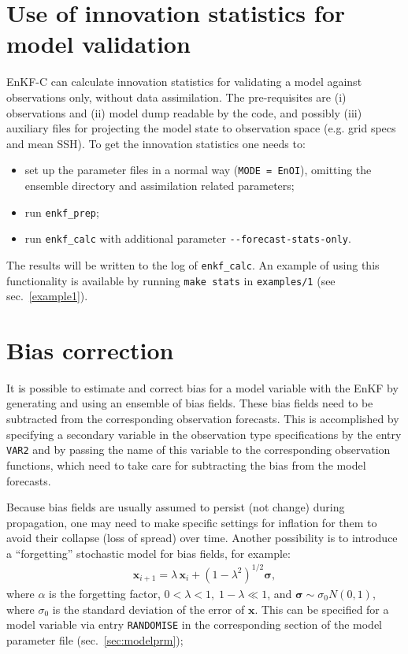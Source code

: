 \documentclass[11pt]{report}
\newcommand{\mb} {\mathbf}
\newcommand{\ms} {\boldsymbol}
\begin{document}
\section{Use of innovation statistics for model validation}

EnKF-C can calculate innovation statistics for validating a model against observations only, without data assimilation.
The pre-requisites are (i) observations and (ii) model dump readable by the code, and possibly (iii) auxiliary files for projecting the model state to observation space (e.g. grid specs and mean SSH).
To get the innovation statistics one needs to:
\begin{itemize}
\item set up the parameter files in a normal way (\verb|MODE = EnOI|), omitting the ensemble directory and assimilation related parameters;
\item run \verb|enkf_prep|;
\item run \verb|enkf_calc| with additional parameter \verb|--forecast-stats-only|.
\end{itemize}
The results will be written to the log of \verb|enkf_calc|. 
An example of using this functionality is available by running \verb|make stats| in \verb|examples/1| (see sec.~\ref{example1}).

\section{Bias correction}
\label{sec:bias}

It is possible to estimate and correct bias for a model variable with the EnKF by generating and using an ensemble of bias fields.
These bias fields need to be subtracted from the corresponding observation forecasts.
This is accomplished by specifying a secondary variable in the observation type specifications by the entry \verb|VAR2| and by passing the name of this variable to the corresponding observation functions, which need to take care for subtracting the bias from the model forecasts.

Because bias fields are usually assumed to persist (not change) during propagation, one may need to make specific settings for inflation for them to avoid their collapse (loss of spread) over time.
Another possibility is to introduce a ``forgetting'' stochastic model for bias fields, for example:
\begin{align*}
  \mb x_{i+1} = \lambda \, \mb x_i + (1 - \lambda^2)^{1/2} \ms \sigma,
\end{align*}
where $\alpha$ is the forgetting factor, $0 < \lambda < 1, \; 1 - \lambda \ll 1$, and $\ms \sigma \sim \sigma_0 N(0, 1)$, where $\sigma_0$ is the standard deviation of the error of $\mb x$.
This can be specified for a model variable via entry \verb|RANDOMISE| in the corresponding section of the model parameter file (sec.~\ref{sec:modelprm});
\end{document}
